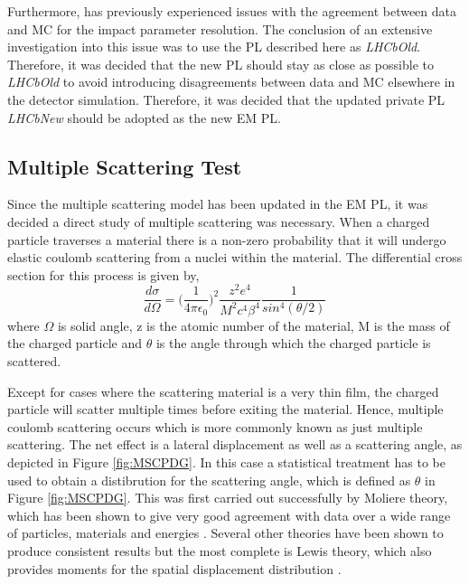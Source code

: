 Furthermore, \lhcb has previously experienced issues with the agreement between data and MC for the impact parameter resolution.  The conclusion of an extensive investigation into this issue was to use the PL described here as \textit{LHCbOld}.  Therefore, it was decided that the new PL should stay as close as possible to \textit{LHCbOld} to avoid introducing disagreements between data and MC elsewhere in the detector simulation.  Therefore, it was decided that the updated \lhcb private PL \textit{LHCbNew} should be adopted as the new EM PL.





\clearpage

\subsection{Multiple Scattering Test}
\label{sec:Multiple Scattering Test}
Since the multiple scattering model has been updated in the EM PL, it was decided a direct study of multiple scattering was necessary.  When a charged particle traverses a material there is a non-zero probability that it will undergo elastic coulomb scattering from a nuclei within the material.  The differential cross section for this process is given by,
\begin{equation}
  \label{eq:Rutherford}
  \frac{d\sigma}{d\Omega}=\big(\frac{1}{4\pi\epsilon_0}\big)^2\frac{z^2e^4}{M^2c^4\beta^4}\frac{1}{sin^4(\theta/2)}
  \end{equation}
where $\Omega$ is solid angle, z is the atomic number of the material, M is the mass of the charged particle and $\theta$ is the angle through which the charged particle is scattered\cite{eisberg1974quantum}.

Except for cases where the scattering material is a very thin film, the charged particle will scatter multiple times before exiting the material.  Hence, multiple coulomb scattering occurs which is more commonly known as just multiple scattering. The net effect is a lateral displacement as well as a scattering angle, as depicted in Figure \ref{fig:MSCPDG}.  In this case a statistical treatment has to be used to obtain a distibrution for the scattering angle, which is defined as $\theta$ in Figure \ref{fig:MSCPDG}. This was first carried out successfully by Moliere theory, which has been shown to give very good agreement with data over a wide range of particles, materials and energies \cite{PhysRev.89.1256,Gottschalk1993467}.  Several other theories have been shown to produce consistent results but the most complete is Lewis theory, which also provides moments for the spatial displacement distribution \cite{PhysRev.78.526}.


